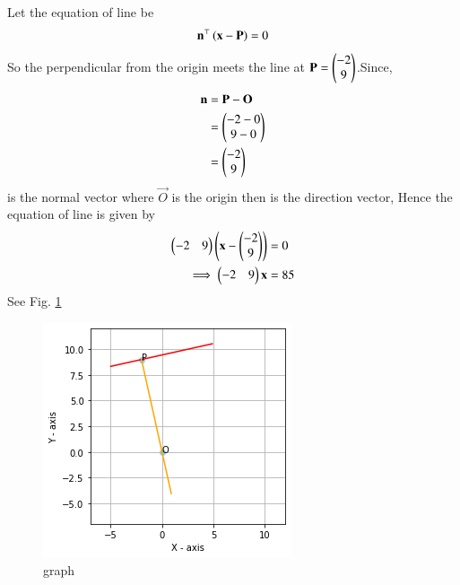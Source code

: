 Let the equation of line be
\begin{align}
    \mathbf{n}^\top\left(\mathbf{x}-\mathbf{P}\right)=0
\end{align}
So the perpendicular from the origin meets the line at $\mathbf{P}= \begin{pmatrix}-2 \\ 9\end{pmatrix}$.Since,
\begin{align}
   \mathbf{n}&= \mathbf{P}-\mathbf{O}\\
   &=\begin{pmatrix}-2-0\\9-0\end{pmatrix}\\
   &=\begin{pmatrix}-2\\9\end{pmatrix}
\end{align}
is the normal vector where $\vec{O}$ is the origin then 
is the direction vector, Hence the equation of line is given by
\begin{align}
   \begin{pmatrix}-2 & 9\end{pmatrix}\left(\mathbf{x}-\begin{pmatrix}-2 \\ 9\end{pmatrix}\right)&=0 \\
\implies     \begin{pmatrix}-2 & 9\end{pmatrix}\mathbf{x}&= 85
\end{align}
    See Fig. \ref{aug/2/21/fig:my_label}
\begin{figure}[htp]
    \centering
    \includegraphics{solutions/aug/2/21/Assignment_4.png}
    \caption{graph}
    \label{aug/2/21/fig:my_label}
\end{figure}

